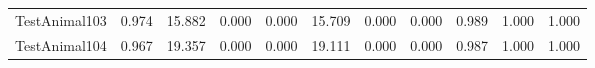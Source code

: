 \begin{tabular}{lrrrrrrrrrr}
TestAnimal103 &     0.974 &      15.882 &        0.000 &       0.000 &         15.709 &           0.000 &          0.000 &                      0.989 &                       1.000 &                      1.000 \\
TestAnimal104 &     0.967 &      19.357 &        0.000 &       0.000 &         19.111 &           0.000 &          0.000 &                      0.987 &                       1.000 &                      1.000 \\
\bottomrule
\end{tabular}
